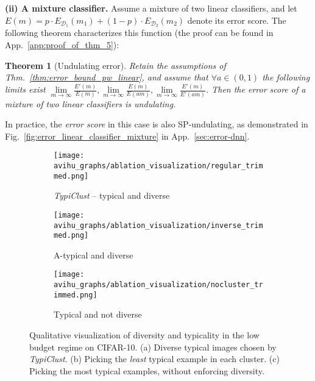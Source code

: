 \documentclass{article}
\newcommand{\myparagraph}[1]{\smallskip\noindent\textbf{#1}}
\newcommand{\Dd}{\mathcal{D}}
\newcommand{\pR}{1}\newcommand{\rR}{2}\newcommand{\prR}{i}
\newcommand{\ahard}{a}
\newcommand{\app}{App.}
\newtheorem{theorem}{Theorem}
\begin{document}
\myparagraph{(ii) A mixture classifier.}
Assume a mixture of two linear classifiers, and let $E(m)=p\cdot E_{\Dd_\pR}(m_\pR) + (1-p)\cdot E_{\Dd_\rR}(m_\rR)$ denote its error score. The following theorem characterizes this function (the proof can be found in \app~\ref{app:proof_of_thm_5}):
\begin{theorem}[Undulating error]
\label{thm:undulating_pw_linear}
Retain the assumptions of Thm.~\ref{thm:error_bound_pw_linear}, and assume that $\forall\ahard\!\in\! (0,1)$ the following limits exist  $\lim\limits_{m\to\infty}\frac{E'(m)}{E(m)},\lim\limits_{m\rightarrow\infty}\frac{E(m)}{E(\ahard m)}, \lim\limits_{m\rightarrow\infty}\frac{E'(m)}{E'(\ahard m)}$. 
Then the error score of a mixture of two linear classifiers is undulating. 
\end{theorem}

In practice, the \emph{error score} in this case is also SP-undulating, as demonstrated in Fig.~\ref{fig:error_linear_classifier_mixture} in \app~\ref{sec:error-dnn}.

\begin{figure*}[thb!]
    \begin{subfigure}{.33\textwidth}
      \centering
      \texttt{[image: avihu\_graphs/ablation\_visualization/regular\_trimmed.png]}
      \caption{\emph{TypiClust} -- typical and diverse}
      \label{subfig:clustering_matters_regular}
    \end{subfigure}
    \begin{subfigure}{.33\textwidth}
      \centering
      \texttt{[image: avihu\_graphs/ablation\_visualization/inverse\_trimmed.png]}
      \caption{A-typical and diverse}
      \label{subfig:clustering_matters_inverse}
    \end{subfigure}
    \begin{subfigure}{.33\textwidth}
      \centering
      \texttt{[image: avihu\_graphs/ablation\_visualization/nocluster\_trimmed.png]}
      \caption{Typical and not diverse}
      \label{subfig:clustering_matters_nocluster}
    \end{subfigure}
    \caption{Qualitative visualization of diversity and typicality in the low budget regime on CIFAR-10. (a) Diverse typical images chosen by \emph{TypiClust}. (b) Picking the \emph{least} typical example in each cluster. (c) Picking the most typical examples, without enforcing diversity.}
    \label{fig:clustering_matters}
\vspace{-0.3cm}
\end{figure*}
\end{document}
